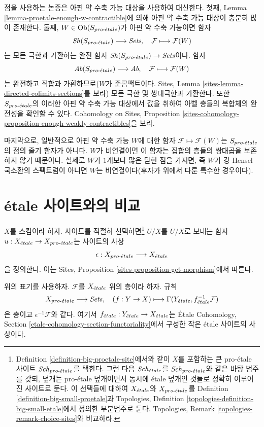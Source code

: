 \medskip\noindent
점을 사용하는 논증은 아핀 약 수축 가능 대상을 사용하여 대신한다.
첫째, Lemma \ref{lemma-proetale-enough-w-contractible}에 의해 아핀 약
수축 가능 대상이 충분히 많이 존재한다. 둘째,
$W \in \mathop{\mathrm{Ob}}\nolimits(S_{pro\text{-}\acute{e}tale})$가 아핀 약 수축 가능이면 함자
$$
\mathop{\mathit{Sh}}\nolimits(S_{pro\text{-}\acute{e}tale}) \longrightarrow \textit{Sets},\quad
\mathcal{F} \longmapsto \mathcal{F}(W)
$$
는 모든 극한과 가환하는 완전 함자
$\mathop{\mathit{Sh}}\nolimits(S_{pro\text{-}\acute{e}tale}) \to \textit{Sets}$이다. 함자
$$
\textit{Ab}(S_{pro\text{-}\acute{e}tale}) \longrightarrow \textit{Ab},\quad
\mathcal{F} \longmapsto \mathcal{F}(W)
$$
는 완전하고 직합과 가환하므로($W$가 준콤팩트이다. Sites, Lemma
\ref{sites-lemma-directed-colimits-sections}를 보라) 모든 극한 및
쌍대극한과 가환한다. 또한 $S_{pro\text{-}\acute{e}tale}$의 이러한 아핀 약 수축 가능
대상에서 값을 취하여 아벨 층들의 복합체의 완전성을 확인할 수 있다.
Cohomology on Sites, Proposition
\ref{sites-cohomology-proposition-enough-weakly-contractibles}을 보라.

\medskip\noindent
마지막으로, 일반적으로 아핀 약 수축 가능 $W$에 대한 함자
$\mathcal{F} \mapsto \mathcal{F}(W)$는 $S_{pro\text{-}\acute{e}tale}$의 점의 줄기
함자가 아니다. $W$가 비연결이면 이 함자는 집합의 층들의 쌍대곱을
보존하지 않기 때문이다. 실제로 $W$가 $1$개보다 많은 닫힌 점을
가지면, 즉 $W$가 강 Hensel 국소환의 스펙트럼이 아니면 $W$는
비연결이다(후자가 위에서 다룬 특수한 경우이다).






\section{\'etale 사이트와의 비교}
\label{section-comparison}

\noindent
$X$를 스킴이라 하자. 사이트를 적절히 선택하면\footnote{Definition
\ref{definition-big-proetale-site}에서와 같이 $X$를 포함하는 큰
pro-\'etale 사이트 $\mathit{Sch}_{pro\text{-}\acute{e}tale}$를 택한다. 그런 다음
$\mathit{Sch}_{\acute{e}tale}$를 $\mathit{Sch}_{pro\text{-}\acute{e}tale}$와 같은 바탕 범주를 갖되, 덮개는
pro-\'etale 덮개이면서 동시에 \'etale 덮개인 것들로 정확히 이루어진
사이트로 둔다. 이 선택들에 대하여 $X_{\acute{e}tale}$와 $X_{pro\text{-}\acute{e}tale}$를
Definition \ref{definition-big-small-proetale}과 Topologies, Definition
\ref{topologies-definition-big-small-etale}에서 정의한 부분범주로 둔다.
Topologies, Remark \ref{topologies-remark-choice-sites}와 비교하라.}
$U/X$를 $U/X$로 보내는 함자 $u : X_{\acute{e}tale} \to X_{pro\text{-}\acute{e}tale}$는
사이트의 사상
$$
\epsilon : X_{pro\text{-}\acute{e}tale} \longrightarrow X_{\acute{e}tale}
$$
을 정의한다. 이는 Sites, Proposition
\ref{sites-proposition-get-morphism}에서 따른다.

\begin{lemma}
\label{lemma-describe-pullback-from-etale}
위의 표기를 사용하자. $\mathcal{F}$를 $X_{\acute{e}tale}$ 위의 층이라 하자.
규칙
$$
X_{pro\text{-}\acute{e}tale} \longrightarrow \textit{Sets},\quad
(f : Y \to X) \longmapsto \Gamma(Y_{\acute{e}tale}, f_{\acute{e}tale}^{-1}\mathcal{F})
$$
은 층이고 $\epsilon^{-1}\mathcal{F}$와 같다. 여기서
$f_{\acute{e}tale} : Y_{\acute{e}tale} \to X_{\acute{e}tale}$는 \'Etale Cohomology, Section
\ref{etale-cohomology-section-functoriality}에서 구성한 작은 \'etale
사이트의 사상이다.
\end{lemma}

